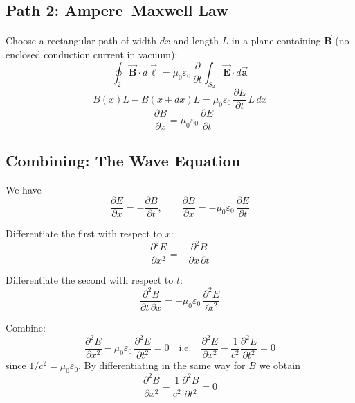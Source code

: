 \documentclass[11pt]{report}
\newcommand{\vbf}[1]{\vec{\mathbf{#1}}}
\begin{document}
\subsection*{Path 2: Ampere--Maxwell Law}

Choose a rectangular path of width $dx$ and length $L$ in a plane containing $\vbf{B}$ (no enclosed conduction current in vacuum):
\begin{equation}
\oint_2 \vbf{B}\cdot d\vbf{\ell} = \mu_0\varepsilon_0\,\frac{\partial}{\partial t}\int_{S_2}\vbf{E}\cdot d\vbf{a}
\end{equation}
\begin{equation}
B(x)L - B(x+dx)L = \mu_0\varepsilon_0\,\frac{\partial E}{\partial t}\,L\,dx
\end{equation}
\begin{equation}
\boxed{-\frac{\partial B}{\partial x} = \mu_0\varepsilon_0\,\frac{\partial E}{\partial t}}
\end{equation}

\subsection*{Combining: The Wave Equation}

We have
\begin{equation}
\frac{\partial E}{\partial x} = -\frac{\partial B}{\partial t}, \qquad \frac{\partial B}{\partial x} = -\mu_0\varepsilon_0\,\frac{\partial E}{\partial t}
\end{equation}

Differentiate the first with respect to $x$:
\begin{equation}
\frac{\partial^2 E}{\partial x^2} = -\frac{\partial^2 B}{\partial x\,\partial t}
\end{equation}

Differentiate the second with respect to $t$:
\begin{equation}
\frac{\partial^2 B}{\partial t\,\partial x} = -\mu_0\varepsilon_0\,\frac{\partial^2 E}{\partial t^2}
\end{equation}

Combine:
\begin{equation}
\boxed{\frac{\partial^2 E}{\partial x^2} - \mu_0\varepsilon_0\,\frac{\partial^2 E}{\partial t^2} = 0 \quad \text{i.e.} \quad \frac{\partial^2 E}{\partial x^2} - \frac{1}{c^2}\frac{\partial^2 E}{\partial t^2} = 0}
\end{equation}
since $1/c^2 = \mu_0\varepsilon_0$. By differentiating in the same way for $B$ we obtain
\begin{equation}
\boxed{\frac{\partial^2 B}{\partial x^2} - \frac{1}{c^2}\frac{\partial^2 B}{\partial t^2} = 0}
\end{equation}
\end{document}
